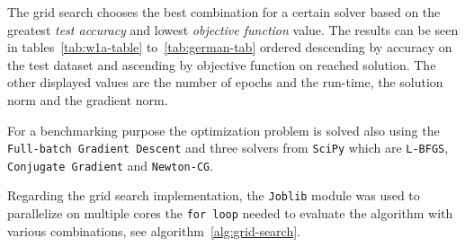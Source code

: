 The grid search chooses the best combination for a certain solver based on the greatest \emph{test accuracy} and lowest \emph{objective function} value. The results can be seen in tables~\vref{tab:w1a-table} to~\ref{tab:german-tab} ordered descending by accuracy on the test dataset and ascending by objective function on reached solution. The other displayed values are the number of epochs and the run-time, the solution norm and the gradient norm.

For a benchmarking purpose the optimization problem is solved also using the \texttt{Full-batch Gradient Descent} and three solvers from \texttt{SciPy} which are \texttt{L-BFGS}, \texttt{Conjugate Gradient} and \texttt{Newton-CG}.%

Regarding the grid search implementation, the \texttt{Joblib} module was used to parallelize on multiple cores the \texttt{for loop} needed to evaluate the algorithm with various combinations, see algorithm~\vref{alg:grid-search}.\par\smallskip






